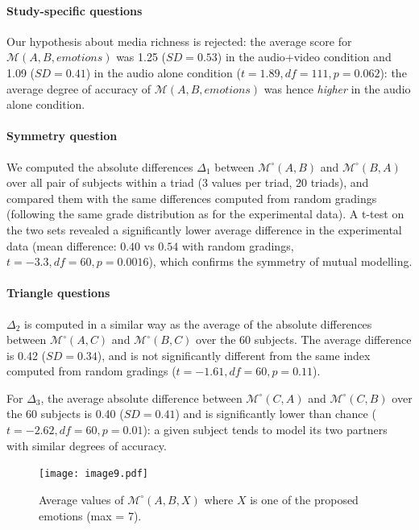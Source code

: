 \documentclass[natbib]{svjour3}
\newcommand{\model}[3]{{$\mathcal{M}(#1, #2, #3)$}}
\newcommand{\Model}[3]{{$\mathcal{M}^{\circ}(#1, #2, #3)$}}
\newcommand{\gModel}[2]{{$\mathcal{M}^{\circ}(#1, #2)$}}
\begin{document}
\paragraph{Study-specific questions} Our hypothesis about media richness is
rejected: the average score for \model{A}{B}{emotions} was 1.25 ($SD = 0.53$) in
the audio+video condition and 1.09 ($SD = 0.41$) in the audio alone condition
($t=1.89, df=111, p = 0.062$): the average degree of accuracy of
\model{A}{B}{emotions} was hence \emph{higher} in the audio alone condition.

\paragraph{Symmetry question} We computed the absolute differences $\Delta_1$
between \gModel{A}{B} and \gModel{B}{A} over all pair of subjects within a triad
(3 values per triad, 20 triads), and compared them with the same differences
computed from random gradings (following the same grade distribution as for the
experimental data). A t-test on the two sets revealed a significantly lower average difference in
the experimental data (mean difference: $0.40$ vs $0.54$ with random gradings,
$t=-3.3, df=60, p = 0.0016$), which confirms the symmetry of mutual modelling.

\paragraph{Triangle questions} $\Delta_2$ is computed in a similar way as the average of
the absolute differences between \gModel{A}{C} and \gModel{B}{C} over the 60
subjects. The average difference is 0.42 ($SD= 0.34$), and is not significantly
different from the same index computed from random gradings ($t=-1.61, df=60,
p=0.11$).

For $\Delta_3$, the average absolute difference between \gModel{C}{A} and
\gModel{C}{B} over the 60 subjects is 0.40 ($SD= 0.41$) and is significantly
lower than chance ($t=-2.62, df=60, p=0.01$): a given subject tends to model its
two partners with similar degrees of accuracy.

\begin{figure}[ht!]
        \centering
        \texttt{[image: image9.pdf]}
        \caption{Average values of \Model{A}{B}{X} where $X$ is one of the proposed
        emotions (max = 7).}
        \label{study3:deg_m_values}
\end{figure}
\end{document}
